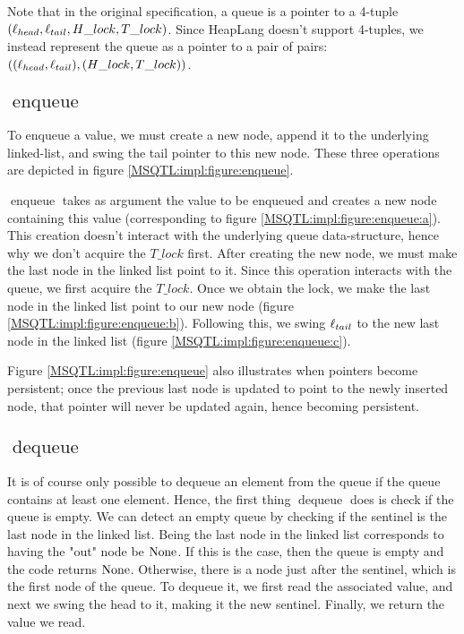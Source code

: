 \documentclass[twoside,11pt,openright]{report}
\newcommand{\enqueue}{\operatorname{enqueue}}
\newcommand{\dequeue}{\operatorname{dequeue}}
\begin{document}
Note that in the original specification, a queue is a pointer to a 4-tuple $(\ell_{head}, \ell_{tail}, H\_lock, T\_lock)$. Since HeapLang doesn't support 4-tuples, we instead represent the queue as a pointer to a pair of pairs: $((\ell_{head}, \ell_{tail}), (H\_lock, T\_lock))$.


\subsection[enqueue]{$\enqueue$}

To enqueue a value, we must create a new node, append it to the underlying linked-list, and swing the tail pointer to this new node. These three operations are depicted in figure \ref{MSQTL:impl:figure:enqueue}.

$\enqueue$ takes as argument the value to be enqueued and creates a new node containing this value (corresponding to figure \ref{MSQTL:impl:figure:enqueue:a}). This creation doesn't interact with the underlying queue data-structure, hence why we don't acquire the $T\_lock$ first. After creating the new node, we must make the last node in the linked list point to it. Since this operation interacts with the queue, we first acquire the $T\_lock$. Once we obtain the lock, we make the last node in the linked list point to our new node (figure \ref{MSQTL:impl:figure:enqueue:b}). Following this, we swing $\ell_{tail}$ to the new last node in the linked list (figure \ref{MSQTL:impl:figure:enqueue:c}).

Figure \ref{MSQTL:impl:figure:enqueue} also illustrates when pointers become persistent; once the previous last node is updated to point to the newly inserted node, that pointer will never be updated again, hence becoming persistent.

\subsection[dequeue]{$\dequeue$}

It is of course only possible to dequeue an element from the queue if the queue contains at least one element. Hence, the first thing $\dequeue$ does is check if the queue is empty. We can detect an empty queue by checking if the sentinel is the last node in the linked list. Being the last node in the linked list corresponds to having the "out" node be $\operatorname{None}$. If this is the case, then the queue is empty and the code returns $\operatorname{None}$. Otherwise, there is a node just after the sentinel, which is the first node of the queue. To dequeue it, we first read the associated value, and next we swing the head to it, making it the new sentinel. Finally, we return the value we read.
\end{document}
